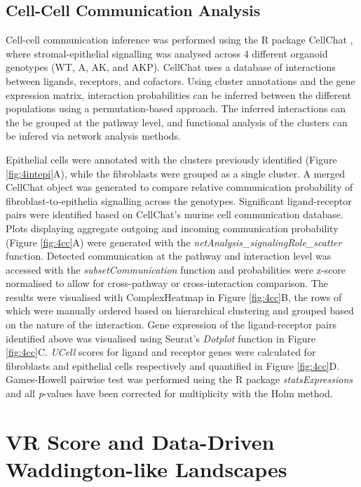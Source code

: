 \subsection{Cell-Cell Communication Analysis}

Cell-cell communication inference was performed using the R package CellChat \cite{jin_inference_2021}, where stromal-epithelial signalling was analysed across 4 different organoid genotypes (WT, A, AK, and AKP). CellChat uses a database of interactions between ligands, receptors, and cofactors. 
Using cluster annotations and the gene expression matrix, interaction probabilities can be inferred between the different populations using a permutation-based approach. The inferred interactions can the be grouped at the pathway level, and functional analysis of the clusters can be infered via network analysis methods. 

Epithelial cells were annotated with the clusters previously identified (Figure \ref{fig:4intepi}A), while the fibroblasts were grouped as a single cluster. A merged CellChat object was generated to compare relative communication probability of fibroblast-to-epithelia signalling across the genotypes. Significant ligand-receptor pairs were identified based on CellChat's murine cell communication database. Plots displaying aggregate outgoing and incoming communication probability (Figure \ref{fig:4cc}A) were generated with the \textit{netAnalysis\_signalingRole\_scatter} function. Detected communication at the pathway and interaction level was accessed with the \textit{subsetCommunication} function and probabilities were z-score normalised to allow for cross-pathway or cross-interaction comparison. The results were visualised with ComplexHeatmap in Figure \ref{fig:4cc}B, the rows of which were manually ordered based on hierarchical clustering and grouped based on the nature of the interaction. Gene expression of the ligand-receptor pairs identified above was visualised using Seurat's \textit{Dotplot} function in Figure \ref{fig:4cc}C. \textit{UCell} scores for ligand and receptor genes were calculated for fibroblasts and epithelial cells respectively and quantified in Figure \ref{fig:4cc}D. Games-Howell pairwise test was performed using the R package \textit{statsExpressions} and all \textit{p}-values have been corrected for multiplicity with the Holm method.

\newpage
\section{VR Score and Data-Driven Waddington-like Landscapes}

